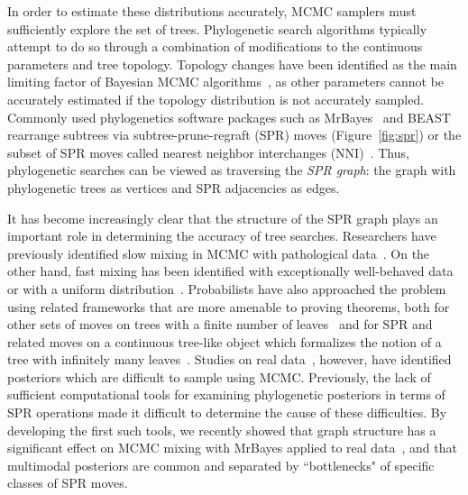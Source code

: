\documentclass[]{elsarticle}
\begin{document}
In order to estimate these distributions accurately, MCMC samplers must sufficiently explore the set of trees.
Phylogenetic search algorithms typically attempt to do so through a combination of modifications to the continuous parameters and tree topology.
Topology changes have been identified as the main limiting factor of Bayesian MCMC algorithms~\citep{lakner2008efficiency,hohna2012guided}, as other parameters cannot be accurately estimated if the topology distribution is not accurately sampled.
Commonly used phylogenetics software packages such as MrBayes~\citep{Ronquist2012-hi} and BEAST~\citep{bouckaert2014beast} rearrange subtrees via subtree-prune-regraft (SPR) moves (Figure~\ref{fig:spr}) or the subset of SPR moves called nearest neighbor interchanges (NNI)~\citep{robinson1971comparison}.
Thus, phylogenetic searches can be viewed as traversing the \emph{SPR graph}: the graph with phylogenetic trees as vertices and SPR adjacencies as edges.

It has become increasingly clear that the structure of the SPR graph plays an important role in determining the accuracy of tree searches.
Researchers have previously identified slow mixing in MCMC with pathological data~\citep{Mossel2005-ly,Mossel2006-fo,Ronquist2006-fv}.
On the other hand, fast mixing has been identified with exceptionally well-behaved data~\citep{Stefankovic2011-hu} or with a uniform distribution~\citep{spade2014note}.
 Probabilists have also approached the problem using related frameworks that are more amenable to proving theorems, both for other sets of moves on trees with a finite number of leaves~\citep{Aldous2000-vg,Diaconis2002-gy} and for SPR and related moves on a continuous tree-like object which formalizes the notion of a tree with infinitely many leaves~\citep{Evans2006-xh,Athreya2014-de}.
Studies on real data~\citep{beiko2006searching, lakner2008efficiency}, however, have identified posteriors which are difficult to sample using MCMC.
Previously, the lack of sufficient computational tools for examining phylogenetic posteriors in terms of SPR operations made it difficult to determine the cause of these difficulties.
By developing the first such tools, we recently showed that graph structure has a significant effect on MCMC mixing with MrBayes applied to real data~\citep{Whidden2015-yi}, and that multimodal posteriors are common and separated by ``bottlenecks" of specific classes of SPR moves.
\end{document}
